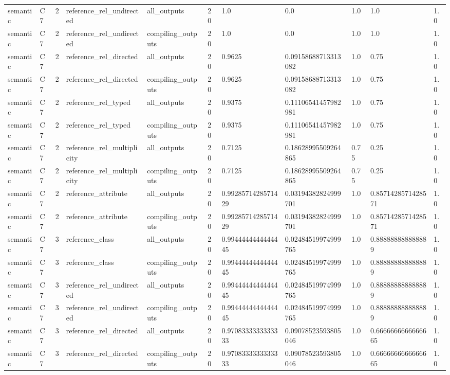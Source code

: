 \begin{tabular}{lllllllllll}
semantic & C7 & 2 & reference\_rel\_undirected & all\_outputs & 20 & 1.0 & 0.0 & 1.0 & 1.0 & 1.0 \\
semantic & C7 & 2 & reference\_rel\_undirected & compiling\_outputs & 20 & 1.0 & 0.0 & 1.0 & 1.0 & 1.0 \\
semantic & C7 & 2 & reference\_rel\_directed & all\_outputs & 20 & 0.9625 & 0.09158688713313082 & 1.0 & 0.75 & 1.0 \\
semantic & C7 & 2 & reference\_rel\_directed & compiling\_outputs & 20 & 0.9625 & 0.09158688713313082 & 1.0 & 0.75 & 1.0 \\
semantic & C7 & 2 & reference\_rel\_typed & all\_outputs & 20 & 0.9375 & 0.11106541457982981 & 1.0 & 0.75 & 1.0 \\
semantic & C7 & 2 & reference\_rel\_typed & compiling\_outputs & 20 & 0.9375 & 0.11106541457982981 & 1.0 & 0.75 & 1.0 \\
semantic & C7 & 2 & reference\_rel\_multiplicity & all\_outputs & 20 & 0.7125 & 0.18628995509264865 & 0.75 & 0.25 & 1.0 \\
semantic & C7 & 2 & reference\_rel\_multiplicity & compiling\_outputs & 20 & 0.7125 & 0.18628995509264865 & 0.75 & 0.25 & 1.0 \\
semantic & C7 & 2 & reference\_attribute & all\_outputs & 20 & 0.9928571428571429 & 0.03194382824999701 & 1.0 & 0.8571428571428571 & 1.0 \\
semantic & C7 & 2 & reference\_attribute & compiling\_outputs & 20 & 0.9928571428571429 & 0.03194382824999701 & 1.0 & 0.8571428571428571 & 1.0 \\
semantic & C7 & 3 & reference\_class & all\_outputs & 20 & 0.9944444444444445 & 0.02484519974999765 & 1.0 & 0.888888888888889 & 1.0 \\
semantic & C7 & 3 & reference\_class & compiling\_outputs & 20 & 0.9944444444444445 & 0.02484519974999765 & 1.0 & 0.888888888888889 & 1.0 \\
semantic & C7 & 3 & reference\_rel\_undirected & all\_outputs & 20 & 0.9944444444444445 & 0.02484519974999765 & 1.0 & 0.888888888888889 & 1.0 \\
semantic & C7 & 3 & reference\_rel\_undirected & compiling\_outputs & 20 & 0.9944444444444445 & 0.02484519974999765 & 1.0 & 0.888888888888889 & 1.0 \\
semantic & C7 & 3 & reference\_rel\_directed & all\_outputs & 20 & 0.9708333333333333 & 0.09078523593805046 & 1.0 & 0.6666666666666665 & 1.0 \\
semantic & C7 & 3 & reference\_rel\_directed & compiling\_outputs & 20 & 0.9708333333333333 & 0.09078523593805046 & 1.0 & 0.6666666666666665 & 1.0 \\

\end{tabular}
